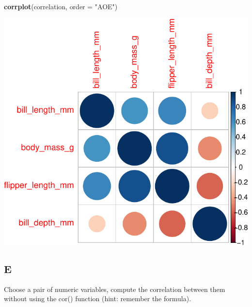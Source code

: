 \documentclass[
]{article}
\newenvironment{Shaded}{\begin{snugshade}}{\end{snugshade}}
\newcommand{\AttributeTok}[1]{\textcolor[rgb]{0.13,0.29,0.53}{#1}}
\newcommand{\FunctionTok}[1]{\textcolor[rgb]{0.13,0.29,0.53}{\textbf{#1}}}
\newcommand{\NormalTok}[1]{#1}
\newcommand{\StringTok}[1]{\textcolor[rgb]{0.31,0.60,0.02}{#1}}
\begin{document}
\begin{Shaded}
\begin{Highlighting}[]
\FunctionTok{corrplot}\NormalTok{(correlation, }\AttributeTok{order =} \StringTok{"AOE"}\NormalTok{)}
\end{Highlighting}
\end{Shaded}

\includegraphics{es_files/figure-latex/unnamed-chunk-23-1.pdf}

\hypertarget{e-2}{%
\subsection{E}\label{e-2}}

Choose a pair of numeric variables, compute the correlation between them
without using the cor() function (hint: remember the formula).
\end{document}
